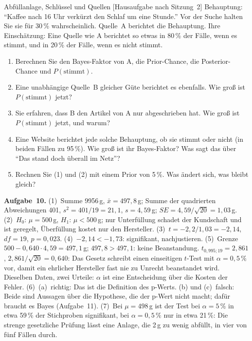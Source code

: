 \begin{uebungsblattc}{Abfüllanlage, Schlüssel und Quellen}
[Hausaufgabe nach Sitzung~2]
Behauptung: \enquote{Kaffee nach 16 Uhr verkürzt den Schlaf um eine
Stunde.} Vor der Suche halten Sie sie für 30\,\% wahrscheinlich.
Quelle~A berichtet die Behauptung. Ihre Einschätzung: Eine Quelle wie A
berichtet so etwas in 80\,\% der Fälle, wenn es stimmt, und in 20\,\% der
Fälle, wenn es nicht stimmt.
\begin{enumerate}
  \item Berechnen Sie den Bayes-Faktor von A, die Prior-Chance, die
    Posterior-Chance und $P(\text{stimmt})$.
  \item Eine unabhängige Quelle~B gleicher Güte berichtet es ebenfalls.
    Wie groß ist $P(\text{stimmt})$ jetzt?
  \item Sie erfahren, dass B den Artikel von A nur abgeschrieben hat. Wie
    groß ist $P(\text{stimmt})$ jetzt, und warum?
  \item Eine Website berichtet jede solche Behauptung, ob sie stimmt oder
    nicht (in beiden Fällen zu 95\,\%). Wie groß ist ihr Bayes-Faktor?
    Was sagt das über \enquote{Das stand doch überall im Netz}?
  \item Rechnen Sie (1) und (2) mit einem Prior von 5\,\%. Was ändert
    sich, was bleibt gleich?
\end{enumerate}

\begin{lehrhinweis}
\textbf{Aufgabe~10.} (1)~Summe 9956\,g, $\bar{x}=497{,}8$\,g; Summe der
quadrierten Abweichungen 401, $s^2=401/19=21{,}1$, $s=4{,}59$\,g;
$\mathit{SE}=4{,}59/\sqrt{20}=1{,}03$\,g. (2)~$H_0$: $\mu=500$\,g,
$H_1$: $\mu<500$\,g; nur Unterfüllung schadet der Kundschaft und ist
geregelt, Überfüllung kostet nur den Hersteller. (3)~$t=-2{,}2/1{,}03=-2{,}14$,
$\mathit{df}=19$, $p=0{,}023$. (4)~$-2{,}14<-1{,}73$: signifikant,
nachjustieren. (5)~Grenze $500-0{,}640\cdot4{,}59=497{,}1$\,g;
$497{,}8>497{,}1$: keine Beanstandung. $t_{0,995;19}=2{,}861$,
$2{,}861/\sqrt{20}=0{,}640$: Das Gesetz schreibt einen einseitigen
$t$-Test mit $\alpha=0{,}5\,\%$ vor, damit ein ehrlicher Hersteller fast
nie zu Unrecht beanstandet wird. Dieselben Daten, zwei Urteile: $\alpha$
ist eine Entscheidung über die Kosten der Fehler. (6)~(a)~richtig: Das
ist die Definition des p-Werts. (b) und (c)~falsch: Beide sind Aussagen
über die Hypothese, die der p-Wert nicht macht; dafür braucht es Bayes
(Aufgabe~11). (7)~Bei $\mu=498$\,g ist der Test bei $\alpha=5\,\%$ in
etwa 59\,\% der Stichproben signifikant, bei $\alpha=0{,}5\,\%$ nur in
etwa 21\,\%: Die strenge gesetzliche Prüfung lässt eine Anlage, die 2\,g
zu wenig abfüllt, in vier von fünf Fällen durch.


\end{lehrhinweis}
\end{uebungsblattc}
